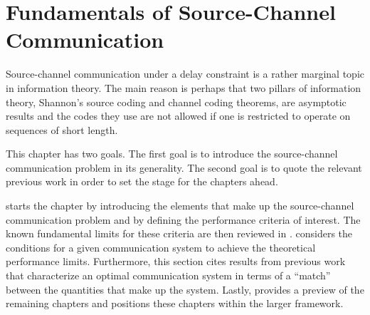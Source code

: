 \chapter{Fundamentals of Source-Channel Communication}\label{ch:fundamentals}

Source-channel communication under a delay constraint is a rather marginal topic
in information theory. The main reason is perhaps that two pillars of
information theory, Shannon's source coding and channel coding theorems, are
asymptotic results and the codes they use are not allowed if one is restricted
to operate on sequences of short length. 

This chapter has two goals. The first goal is to introduce the source-channel
communication problem in its generality. The second goal is to quote the
relevant previous work in order to set the stage for the chapters ahead.

 starts the chapter by introducing the elements that make up the
source-channel communication problem and by defining the performance criteria of
interest. The known fundamental limits for these criteria are then reviewed in
.   considers the conditions for a
given communication system to achieve the theoretical performance limits.
Furthermore, this section cites results from previous work that characterize an
optimal communication system in terms of a ``match'' between the quantities that
make up the system. Lastly,  provides a preview of the
remaining chapters and positions these chapters within the larger framework.

